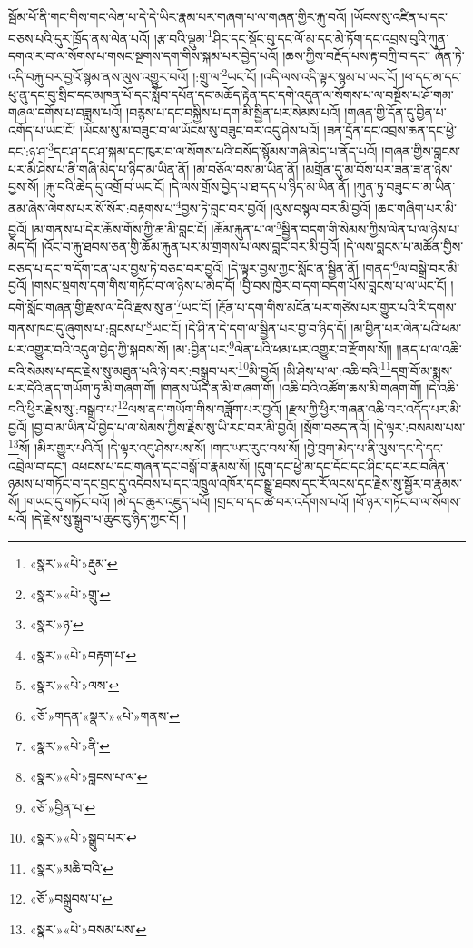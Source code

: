 སྦོམ་པོ་ནི་གང་གིས་གང་ལེན་པ་དེ་དེ་ཡིར་རྣམ་པར་གཞག་པ་ལ་གཞན་གྱིར་རྐུ་བའོ། །ཡོངས་སུ་འཛིན་པ་དང་བཅས་པའི་དུར་ཁྲོད་ནས་ལེན་པའོ། །རྩ་བའི་ལྡུམ་\footnote{«སྣར་»«པེ་»རྡུམ་}ཤིང་དང་སྡོང་བུ་དང་ལོ་མ་དང་མེ་ཏོག་དང་འབྲས་བུའི་ཀུན་དགའ་ར་བ་ལ་སོགས་པ་གསང་སྔགས་དག་གིས་སྐམ་པར་བྱེད་པའོ། །ཆས་ཀྱིས་བརྔོད་པས་རྟ་བཀྲི་བ་དང་། ཞོན་ཏེ་འདི་བརྐུ་བར་བྱའོ་སྙམ་ནས་ལུས་འགྱུར་བའོ། །:གྲུ་ལ་\footnote{«སྣར་»«པེ་»གྲུ་}ཡང་ངོ། །འདི་ལས་འདི་ལྟར་སྙམ་པ་ཡང་ངོ། །ཕ་དང་མ་དང་ཕུ་ནུ་དང་བུ་སྲིང་དང་མཁན་པོ་དང་སློབ་དཔོན་དང་མཆོད་རྟེན་དང་དགེ་འདུན་ལ་སོགས་པ་ལ་བསྔོས་པ་ཤོ་གམ་གཞལ་དགོས་པ་བཟླས་པའོ། །བརྙས་པ་དང་བསྐྱིས་པ་དག་མི་སྦྱིན་པར་སེམས་པའོ། །གཞན་གྱི་དོན་དུ་བྱིན་པ་འགོད་པ་ཡང་ངོ། །ཡོངས་སུ་མ་བཟུང་བ་ལ་ཡོངས་སུ་བཟུང་བར་འདུ་ཤེས་པའོ། །ཟན་དྲོན་དང་འབྲས་ཆན་དང་ཕྱེ་དང་:ཉ་ཤ་\footnote{«སྣར་»ཉ་}དང་ཤ་དང་ཤ་སྐམ་དང་ཁུར་བ་ལ་སོགས་པའི་བསོད་སྙོམས་གཞི་མེད་པ་ནོད་པའོ། །གཞན་གྱིས་བླངས་པར་མི་ཤེས་པ་ནི་གཞི་མེད་པ་ཉིད་མ་ཡིན་ནོ། །མ་བཅོལ་བས་མ་ཡིན་ནོ། །མགྲོན་དུ་མ་བོས་པར་ཟན་ཟ་ན་ཉེས་བྱས་སོ། །རྐུ་བའི་ཆེད་དུ་འགྲོ་བ་ཡང་ངོ། །དེ་ལས་གྲོས་བྱེད་པ་ཐ་དད་པ་ཉིད་མ་ཡིན་ནོ། །ཀུན་ཏུ་བཟུང་བ་མ་ཡིན་ནམ་ཞེས་ལེགས་པར་སོ་སོར་:བརྟགས་པ་\footnote{«སྣར་»«པེ་»བརྟག་པ་}བྱས་ཏེ་བླང་བར་བྱའོ། །ལུས་བསྙལ་བར་མི་བྱའོ། །ཆང་གཞིག་པར་མི་བྱའོ། །མ་གནས་པ་དེར་ཆོས་གོས་ཀྱི་ཆ་མི་བླང་ངོ། །ཆོམ་རྐུན་པ་ལ་\footnote{«སྣར་»«པེ་»ལས་}སྦྱིན་བདག་གི་སེམས་ཀྱིས་ལེན་པ་ལ་ཉེས་པ་མེད་དོ། །འོང་བ་རྐུ་ཐབས་ཅན་གྱི་ཆོམ་རྐུན་པར་མ་གྲགས་པ་ལས་བླང་བར་མི་བྱའོ། །དེ་ལས་བླངས་པ་མཚོན་གྱིས་བཅད་པ་དང་ཁ་དོག་ངན་པར་བྱས་ཏེ་བཅང་བར་བྱའོ། །དེ་ལྟར་བྱས་ཀྱང་སློང་ན་སྦྱིན་ནོ། །གནད་\footnote{«ཅོ་»གདན་«སྣར་»«པེ་»གནས་}ལ་བསྒྲེ་བར་མི་བྱའོ། །གསང་སྔགས་དག་གིས་གཏོང་བ་ལ་ཉེས་པ་མེད་དོ། །བྱི་བས་ཁྱེར་བ་དག་བདག་པོས་བླངས་པ་ལ་ཡང་ངོ། །དགེ་སློང་གཞན་གྱི་རྫས་ལ་དེའི་རྫས་སུ་ན་\footnote{«སྣར་»«པེ་»ནི་}ཡང་ངོ། །རྔོན་པ་དག་གིས་མངོན་པར་གཙེས་པར་གྱུར་པའི་རི་དགས་གནས་ཁང་དུ་ཞུགས་པ་:བླངས་པ་\footnote{«སྣར་»«པེ་»བླངས་པ་ལ་}ཡང་ངོ། །དེ་ཤི་ན་དེ་དག་ལ་སྦྱིན་པར་བྱ་བ་ཉིད་དོ། །མ་བྱིན་པར་ལེན་པའི་ཕམ་པར་འགྱུར་བའི་འདུལ་བྱེད་ཀྱི་སྐབས་སོ། །མ་:བྱིན་པར་\footnote{«ཅོ་»བྱིན་པ་}ལེན་པའི་ཕམ་པར་འགྱུར་བ་རྫོགས་སོ།། །།ནད་པ་ལ་འཆི་བའི་སེམས་པ་དང་རྗེས་སུ་མཐུན་པའི་ཉེ་བར་:བསྒྲུབ་པར་\footnote{«སྣར་»«པེ་»སྒྲུབ་པར་}མི་བྱའོ། །མི་ཤེས་པ་ལ་:འཆི་བའི་\footnote{«སྣར་»མཆི་བའི་}དགྲ་བོ་མ་སྨྲས་པར་དེའི་ནད་གཡོག་ཏུ་མི་གཞག་གོ། །གནས་ཡོད་ན་མི་གཞག་གོ། །འཆི་བའི་འཚོག་ཆས་མི་གཞག་གོ། །དེ་འཆི་བའི་ཕྱིར་རྗེས་སུ་:བསྒྲུབ་པ་\footnote{«ཅོ་»བསྒྲུབས་པ་}ལས་ནད་གཡོག་གིས་བཟློག་པར་བྱའོ། །རྫས་ཀྱི་ཕྱིར་གཞན་འཆི་བར་འདོད་པར་མི་བྱའོ། །བྱ་བ་མ་ཡིན་པ་བྱེད་པ་ལ་སེམས་ཀྱིས་རྗེས་སུ་ཡི་རང་བར་མི་བྱའོ། །སྲོག་བཅད་ནའོ། །དེ་ལྟར་:བསམས་པས་\footnote{«སྣར་»«པེ་»བསམ་པས་}སོ། །མིར་གྱུར་པའིའོ། །དེ་ལྟར་འདུ་ཤེས་པས་སོ། །གང་ཡང་རུང་བས་སོ། །བྱེ་བྲག་མེད་པ་ནི་ལུས་དང་དེ་དང་འབྲེལ་བ་དང་། འཕངས་པ་དང་གཞན་དང་བསྒོ་བ་རྣམས་སོ། །དུག་དང་ཕྱེ་མ་དང་དོང་དང་ཤིང་དང་རང་བཞིན་ཉམས་པ་གཏོང་བ་དང་བྲང་དུ་འདེབས་པ་དང་འཁྲུལ་འཁོར་དང་སྒྱུ་ཐབས་དང་རོ་ལངས་དང་རྗེས་སུ་སྦྱོར་བ་རྣམས་སོ། །གཡང་དུ་གཏོང་བའོ། །མེ་དང་ཆུར་འཇུད་པའོ། །གྲང་བ་དང་ཚ་བར་འདོགས་པའོ། །ཕོ་ཉར་གཏོང་བ་ལ་སོགས་པའོ། །དེ་རྗེས་སུ་སྒྲུབ་པ་ཆུང་ངུ་ཉིད་ཀྱང་ངོ། །
